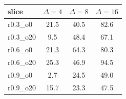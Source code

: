 \begin{tabular}{lccc}
\toprule
slice & $\Delta{=}4$ & $\Delta{=}8$ & $\Delta{=}16$ \\
\midrule
r0.3\_o0 & 21.5 & 40.5 & 82.6 \\
r0.3\_o20 & 9.5 & 48.4 & 67.1 \\
r0.6\_o0 & 21.3 & 64.3 & 80.3 \\
r0.6\_o20 & 25.3 & 46.9 & 94.5 \\
r0.9\_o0 & 2.7 & 24.5 & 49.0 \\
r0.9\_o20 & 15.7 & 23.3 & 47.5 \\
\bottomrule
\end{tabular}
